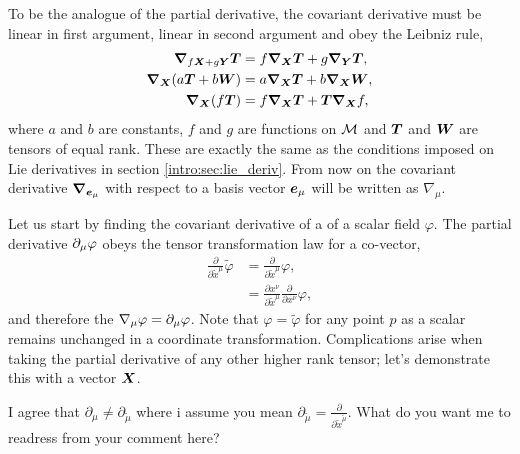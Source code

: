 To be the analogue of the partial derivative, the covariant derivative must be linear in first argument, linear in second argument and obey the Leibniz rule,
\begin{align}
\label{intro:eq:cov-lin}\boldsymbol{\nabla}_{f\boldsymbol{X} + g\boldsymbol{Y}}\boldsymbol{T} &= f\boldsymbol{\nabla}_{\boldsymbol{X}}\boldsymbol{T} + g\boldsymbol{\nabla}_{\boldsymbol{Y}}\boldsymbol{T} , \\
\label{intro:eq:cov-ass}\boldsymbol{\nabla}_{\boldsymbol{X}}( a\boldsymbol{T} + b\boldsymbol{W}) &= a\boldsymbol{\nabla}_{\boldsymbol{X}}\boldsymbol{T} + b\boldsymbol{\nabla}_{\boldsymbol{X}}\boldsymbol{W} , \\
\label{intro:eq:cov-pro}\boldsymbol{\nabla}_{\boldsymbol{X}}( f\boldsymbol{T}) &= f\boldsymbol{\nabla}_{\boldsymbol{X}}\boldsymbol{T} + \boldsymbol{T} \boldsymbol{\nabla}_{\boldsymbol{X}}f ,
\end{align}
where $a$ and $b$ are constants, $f$ and $g$ are functions on $\mathcal{M}$ and $\boldsymbol{T}$ and $\boldsymbol{W}$ are tensors of equal rank. These are exactly the same as the conditions imposed on Lie derivatives in section \ref{intro:sec:lie_deriv}. From now on the covariant derivative $\boldsymbol{\nabla}_{\boldsymbol{e}_\mu}$ with respect to a basis vector $\boldsymbol{e}_\mu$ will be written as $\nabla_\mu$.

Let us start by finding the covariant derivative of a of a scalar field $\varphi$. The partial derivative $\partial_\mu \varphi$ obeys the tensor transformation law for a co-vector,
\begin{align}
\frac{\partial}{\partial \tilde{x}^\mu} \tilde{\varphi} &=\frac{\partial}{\partial \tilde{x}^\mu} {\varphi} ,\\
                                                        &=\frac{\partial x^\nu}{\partial\tilde{x}^\mu}\frac{\partial}{\partial {x}^\nu} {\varphi},
\end{align}
and therefore the $\nabla_\mu \varphi = \partial_\mu \varphi$. Note that $\varphi=\tilde{\varphi}$ for any point $p$ as a scalar remains unchanged in a coordinate transformation. Complications arise when taking the partial derivative of any other higher rank tensor; let's demonstrate this with a vector $\boldsymbol{X}$.

\color{choral} I agree that $\partial_\mu  \neq \partial_{\tilde{\mu}}$ where i assume you mean $\partial_{\tilde \mu} = \frac{\partial}{\partial \tilde{x}^{\tilde \mu}}$. What do you want me to readress from your comment here? \color{black}

